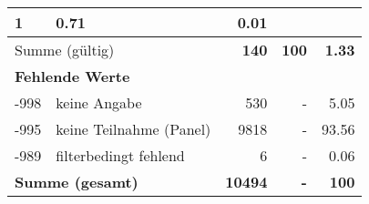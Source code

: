 \begin{longtable}{lXrrr}
       \num{1} &
       \num[round-mode=places,round-precision=2]{0.71} &
         \num[round-mode=places,round-precision=2]{0.01} \\
     \midrule
     \multicolumn{2}{l}{Summe (gültig)} &
       \textbf{\num{140}} &
     \textbf{\num{100}} &
       \textbf{\num[round-mode=places,round-precision=2]{1.33}} \\
     \multicolumn{5}{l}{\textbf{Fehlende Werte}}\\
       -998 &
       keine Angabe &
         \num{530} &
        - &
         \num[round-mode=places,round-precision=2]{5.05} \\
       -995 &
       keine Teilnahme (Panel) &
         \num{9818} &
        - &
         \num[round-mode=places,round-precision=2]{93.56} \\
       -989 &
       filterbedingt fehlend &
         \num{6} &
        - &
         \num[round-mode=places,round-precision=2]{0.06} \\
     \midrule
     \multicolumn{2}{l}{\textbf{Summe (gesamt)}} &
          \textbf{\num{10494}} &
        \textbf{-} &
        \textbf{\num{100}} \\
     \bottomrule
     \end{longtable}
     
